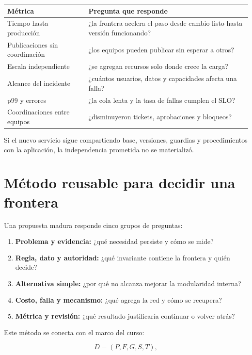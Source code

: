 \documentclass[variant=apuntes,cover=institutional,mode=screen]{ua-engineering-v6-article}
\begin{document}
\begin{center}
\begin{tabular}{p{}p{}}
\toprule
\textbf{Métrica} & \textbf{Pregunta que responde} \\
\midrule
Tiempo hasta producción & ¿la frontera acelera el paso desde cambio listo hasta versión funcionando? \\
Publicaciones sin coordinación & ¿los equipos pueden publicar sin esperar a otros? \\
Escala independiente & ¿se agregan recursos solo donde crece la carga? \\
Alcance del incidente & ¿cuántos usuarios, datos y capacidades afecta una falla? \\
p99 y errores & ¿la cola lenta y la tasa de fallas cumplen el SLO? \\
Coordinaciones entre equipos & ¿disminuyeron tickets, aprobaciones y bloqueos? \\
\bottomrule
\end{tabular}
\end{center}

Si el nuevo servicio sigue compartiendo base, versiones, guardias y procedimientos con la aplicación, la independencia prometida no se materializó.

\section{Método reusable para decidir una frontera}

Una propuesta madura responde cinco grupos de preguntas:

\begin{enumerate}
\item \textbf{Problema y evidencia:} ¿qué necesidad persiste y cómo se mide?
\item \textbf{Regla, dato y autoridad:} ¿qué invariante contiene la frontera y quién decide?
\item \textbf{Alternativa simple:} ¿por qué no alcanza mejorar la modularidad interna?
\item \textbf{Costo, falla y mecanismo:} ¿qué agrega la red y cómo se recupera?
\item \textbf{Métrica y revisión:} ¿qué resultado justificaría continuar o volver atrás?
\end{enumerate}

Este método se conecta con el marco del curso:

\[
D=(P,F,G,S,T),
\]
\end{document}
